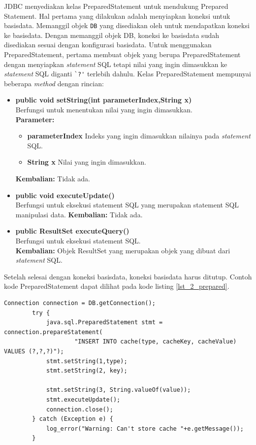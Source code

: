 JDBC menyediakan kelas PreparedStatement untuk mendukung Prepared Statement. Hal pertama yang dilakukan adalah menyiapkan koneksi untuk basisdata. Memanggil objek \verb!DB! yang disediakan oleh \play untuk mendapatkan koneksi ke basisdata. Dengan memanggil objek DB, koneksi ke basisdata sudah disediakan sesuai dengan konfigurasi basisdata. 
Untuk menggunakan PreparedStatement, pertama membuat objek yang berupa PreparedStatement dengan menyiapkan \textit{statement} SQL tetapi nilai yang ingin dimasukkan ke \textit{statement} SQL diganti \verb!`?'! terlebih dahulu.
Kelas PreparedStatement mempunyai beberapa \textit{method} dengan rincian: 
 \begin{itemize}
 	\item \textbf{public void setString(int parameterIndex,String x)}\\
 			Berfungsi untuk menentukan nilai yang ingin dimasukkan.\\[2\baselineskip]
 			\textbf{Parameter:}
 			\begin{itemize}
 				\item \textbf{parameterIndex} Indeks yang ingin dimasukkan nilainya pada \textit{statement} SQL.
 				\item \textbf{String x} Nilai yang ingin dimasukkan.
 			\end{itemize}
 			\textbf{Kembalian:} Tidak ada.
 	\item \textbf{public void executeUpdate()}\\
 			Berfungsi untuk eksekusi statement SQL yang merupakan statement SQL manipulasi data.
 			\textbf{Kembalian:} Tidak ada.
 	\item \textbf{public ResultSet executeQuery()}\\
 			Berfungsi untuk eksekusi statement SQL.\\
 			\textbf{Kembalian:} Objek ResultSet yang merupakan objek yang dibuat dari \textit{statement} SQL.
\end{itemize}
Setelah selesai dengan koneksi basisdata, koneksi basisdata harus ditutup. Contoh kode PreparedStatement dapat dilihat pada kode listing \ref{lst_2_prepared}.

\begin{lstlisting}[caption=Contoh PreparedStatement,label = {lst_2_prepared}]
		Connection connection = DB.getConnection();
        try {
            java.sql.PreparedStatement stmt = connection.prepareStatement(
                    "INSERT INTO cache(type, cacheKey, cacheValue) VALUES (?,?,?)");
            stmt.setString(1,type);
            stmt.setString(2, key);

            stmt.setString(3, String.valueOf(value));
            stmt.executeUpdate();
            connection.close();
        } catch (Exception e) {
            log_error("Warning: Can't store cache "+e.getMessage());
        }
\end{lstlisting}

